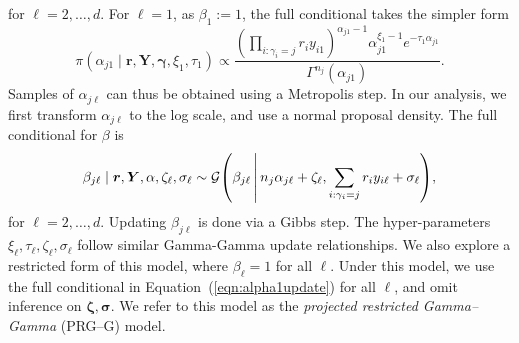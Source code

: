 for $\ell = 2,\ldots,d$.  For $\ell = 1$, as $\beta_{1} := 1$, the full conditional takes the simpler form
\begin{equation}
    \label{eqn:alpha1update}
    \pi(\alpha_{j1}\mid\bm{r},\bm{Y},\bm{\gamma},\xi_1,\tau_1) \propto \frac{\left(\prod_{i:\gamma_i = j}r_iy_{i1}\right)^{\alpha_{j1} - 1}\alpha_{j1}^{\xi_1 - 1}e^{-\tau_1\alpha_{j1}}}{\Gamma^{n_j}(\alpha_{j1})}.
\end{equation}
Samples of $\alpha_{j\ell}$ can thus be obtained using a Metropolis step. In our analysis, we first transform $\alpha_{j\ell}$ to the log scale, and use a normal proposal density.
The full conditional for $\beta$ is 
\begin{equation}
    \label{eqn:betafc}
    \beta_{j\ell}\mid\bm{r},\bm{Y},\alpha,\zeta_{\ell},\sigma_{\ell} \sim \mathcal{G}\left(\beta_{j\ell}\bigmid n_j\alpha_{j\ell} + \zeta_\ell, \sum_{i:\gamma_i = j}r_iy_{i\ell} + \sigma_{\ell}\right),
\end{equation}
for $\ell = 2,\ldots, d$.  Updating $\beta_{j\ell}$ is done via a Gibbs step.  The hyper-parameters $\xi_{\ell},\tau_{\ell},\zeta_{\ell},\sigma_{\ell}$ follow similar Gamma-Gamma update relationships.  We also explore a restricted form of this model, where $\beta_{\ell} = 1$ for all $\ell$.  Under this model, we use the full conditional in Equation~(\ref{eqn:alpha1update}) for all $\ell$, and omit inference on $\bm{\zeta},\bm{\sigma}$.  We refer to this model as the \emph{projected restricted Gamma--Gamma} (PRG--G) model.

